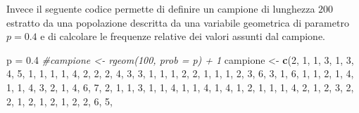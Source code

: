\documentclass[]{book}
\newenvironment{Shaded}{\begin{snugshade}}{\end{snugshade}}
\newcommand{\KeywordTok}[1]{\textcolor[rgb]{0.13,0.29,0.53}{\textbf{#1}}}
\newcommand{\DecValTok}[1]{\textcolor[rgb]{0.00,0.00,0.81}{#1}}
\newcommand{\FloatTok}[1]{\textcolor[rgb]{0.00,0.00,0.81}{#1}}
\newcommand{\StringTok}[1]{\textcolor[rgb]{0.31,0.60,0.02}{#1}}
\newcommand{\CommentTok}[1]{\textcolor[rgb]{0.56,0.35,0.01}{\textit{#1}}}
\newcommand{\NormalTok}[1]{#1}
\begin{document}
Invece il seguente codice permette di definire un campione di lunghezza
\(200\) estratto da una popolazione descritta da una variabile
geometrica di parametro \(p=0.4\) e di calcolare le frequenze relative
dei valori assunti dal campione.

\begin{Shaded}
\begin{Highlighting}[]
\NormalTok{p =}\StringTok{ }\FloatTok{0.4}
\CommentTok{#campione <- rgeom(100, prob = p) + 1}
\NormalTok{campione <-}\StringTok{ }\KeywordTok{c}\NormalTok{(}\DecValTok{2}\NormalTok{, }\DecValTok{1}\NormalTok{, }\DecValTok{1}\NormalTok{, }\DecValTok{3}\NormalTok{, }\DecValTok{1}\NormalTok{, }\DecValTok{3}\NormalTok{, }\DecValTok{4}\NormalTok{, }\DecValTok{5}\NormalTok{, }\DecValTok{1}\NormalTok{, }\DecValTok{1}\NormalTok{, }\DecValTok{1}\NormalTok{, }\DecValTok{1}\NormalTok{, }\DecValTok{4}\NormalTok{, }\DecValTok{2}\NormalTok{, }\DecValTok{2}\NormalTok{, }\DecValTok{2}\NormalTok{, }\DecValTok{4}\NormalTok{, }\DecValTok{3}\NormalTok{, }\DecValTok{3}\NormalTok{, }\DecValTok{1}\NormalTok{, }
              \DecValTok{1}\NormalTok{, }\DecValTok{1}\NormalTok{, }\DecValTok{2}\NormalTok{, }\DecValTok{2}\NormalTok{, }\DecValTok{1}\NormalTok{, }\DecValTok{1}\NormalTok{, }\DecValTok{1}\NormalTok{, }\DecValTok{2}\NormalTok{, }\DecValTok{3}\NormalTok{, }\DecValTok{6}\NormalTok{, }\DecValTok{3}\NormalTok{, }\DecValTok{1}\NormalTok{, }\DecValTok{6}\NormalTok{, }\DecValTok{1}\NormalTok{, }\DecValTok{1}\NormalTok{, }\DecValTok{2}\NormalTok{, }\DecValTok{1}\NormalTok{, }\DecValTok{4}\NormalTok{, }\DecValTok{1}\NormalTok{, }\DecValTok{1}\NormalTok{, }
              \DecValTok{4}\NormalTok{, }\DecValTok{3}\NormalTok{, }\DecValTok{2}\NormalTok{, }\DecValTok{1}\NormalTok{, }\DecValTok{4}\NormalTok{, }\DecValTok{6}\NormalTok{, }\DecValTok{7}\NormalTok{, }\DecValTok{2}\NormalTok{, }\DecValTok{1}\NormalTok{, }\DecValTok{1}\NormalTok{, }\DecValTok{3}\NormalTok{, }\DecValTok{1}\NormalTok{, }\DecValTok{1}\NormalTok{, }\DecValTok{4}\NormalTok{, }\DecValTok{1}\NormalTok{, }\DecValTok{1}\NormalTok{, }\DecValTok{4}\NormalTok{, }\DecValTok{1}\NormalTok{, }\DecValTok{4}\NormalTok{, }\DecValTok{1}\NormalTok{, }
              \DecValTok{2}\NormalTok{, }\DecValTok{1}\NormalTok{, }\DecValTok{1}\NormalTok{, }\DecValTok{1}\NormalTok{, }\DecValTok{4}\NormalTok{, }\DecValTok{2}\NormalTok{, }\DecValTok{1}\NormalTok{, }\DecValTok{2}\NormalTok{, }\DecValTok{3}\NormalTok{, }\DecValTok{2}\NormalTok{, }\DecValTok{2}\NormalTok{, }\DecValTok{1}\NormalTok{, }\DecValTok{2}\NormalTok{, }\DecValTok{1}\NormalTok{, }\DecValTok{2}\NormalTok{, }\DecValTok{1}\NormalTok{, }\DecValTok{2}\NormalTok{, }\DecValTok{2}\NormalTok{, }\DecValTok{6}\NormalTok{, }\DecValTok{5}\NormalTok{, }

\end{Highlighting}
\end{Shaded}
\end{document}
